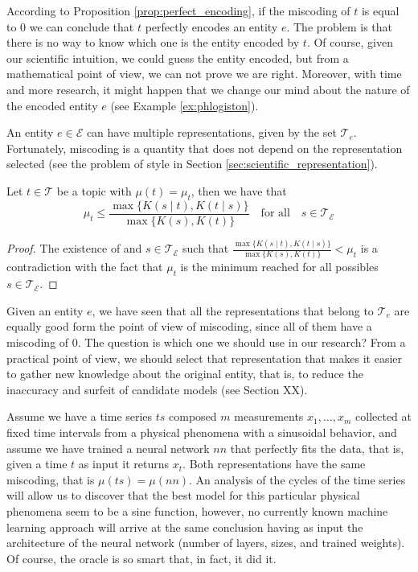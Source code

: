 According to Proposition \ref{prop:perfect_encoding}, if the miscoding of $t$ is equal to 0 we can conclude that $t$ perfectly encodes an entity $e$. The problem is that there is no way to know which one is the entity encoded by $t$. Of course, given our scientific intuition, we could guess the entity encoded, but from a mathematical point of view, we can not prove we are right. Moreover, with time and more research, it might happen that we change our mind about the nature of the encoded entity $e$ (see Example \ref{ex:phlogiston}).

An entity $e \in \mathcal{E}$ can have multiple representations, given by the set $\mathcal{T}_e$. Fortunately, miscoding is a quantity that does not depend on the representation selected (see the problem of style in Section \ref{sec:scientific_representation}).

\begin{proposition}
Let $t \in \mathcal{T}$ be a topic with $\mu(t) = \mu_t$, then we have that
\[
\mu_t \leq \frac{ \max\{ K(s \mid t), K(t \mid s) \} } { \max\{ K(s), K(t) \} } \quad \textrm{for all} \quad s \in \mathcal{T}_\mathcal{E}
\]
\end{proposition}
\begin{proof}
The existence of and $s \in \mathcal{T}_\mathcal{E}$ such that $\frac{ \max\{ K(s \mid t), K(t \mid s) \} } { \max\{ K(s), K(t) \} } < \mu_t$ is a contradiction with the fact that $\mu_t$ is the minimum reached for all possibles $s \in \mathcal{T}_\mathcal{E}$.
\end{proof}

Given an entity $e$, we have seen that all the representations that belong to $\mathcal{T}_e$ are equally good form the point of view of miscoding, since all of them have a miscoding of $0$. The question is which one we should use in our research? From a practical point of view, we should select that representation that makes it easier to gather new knowledge about the original entity, that is, to reduce the inaccuracy and surfeit of candidate models (see Section {\color{red} XX}).

\begin{example}
Assume we have a time series $ts$ composed $m$ measurements $x_1, \ldots, x_m$ collected at fixed time intervals from a physical phenomena with a sinusoidal behavior, and assume we have trained a neural network $nn$ that perfectly fits the data, that is, given a time $t$ as input it returns $x_t$. Both representations have the same miscoding, that is $\mu(ts) = \mu(nn)$. An analysis of the cycles of the time series will allow us to discover that the best model for this particular physical phenomena seem to be a sine function, however, no currently known machine learning approach will arrive at the same conclusion having as input the architecture of the neural network (number of layers, sizes, and trained weights). Of course, the oracle is so smart that, in fact, it did it.
\end{example}

